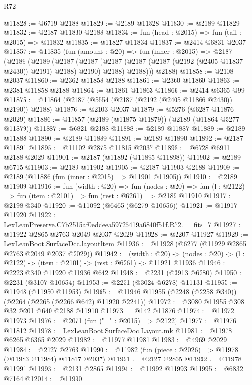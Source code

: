 \begin{lexlean}{R72}
\begin{coremodule}
@11828 := @6719 @2188
@11829 := @2189 @11828
@11830 := @2189 @11829
@11832 := @2187 @11830 @2188
@11834 := fun (head : @2015) => fun (tail : @2015) => @11832
@11835 := @11827 @11834
@11837 := @2414 @6831 @2037
@11857 := @11835
    (fun (amount : @20) =>
    fun (inner : @2015) =>
    @2187
      (@2189
        (@2189
          (@2187
            (@2187 (@2187 (@2187 (@2187 (@2192 (@2405 @11837 @2430)) @2191) @2188) @2190) @2188)
            @2188)))
      @2188)
@11858 := @2108 @2037
@11860 := @2362 @11858 @2188
@11861 := @2360 @11860
@11863 := @2381 @11858 @2188
@11864 := @11861 @11863
@11866 := @2414 @6365 @99
@11875 := @11864 (@2187 (@5554 (@2187 (@2192 (@2405 @11866 @2430)) @2190)) @2188)
@11876 := @2103 @2037
@11879 := @5276 (@6287 @11876 @2029)
@11886 := @11857 (@2189 (@11875 @11879)) (@2189 (@11864 @5277 @11879))
@11887 := @6821 @2188
@11888 := @2189 @11887
@11889 := @2189 @11888
@11890 := @2189 @11889
@11891 := @2189 @11890
@11892 := @2187 @11891
@11895 := @11102 @2875 @11815 @2037
@11898 := @6728 @6911 @2188 @2029
@11901 := @2187 (@11892 (@11895 @11898))
@11902 := @2189 @6715
@11903 := @2189 @11902
@11905 := @2187 @11903 @2188
@11909 := @2189 (@11886 (fun (inner : @2015) => @11901 @11905))
@11910 := @2189 @11909
@11916 := fun (width : @20) =>
  fun (nodes : @20) => fun (l : @2122) => fun (item : @2101) => fun (rest : @6261) => @2189 @11910
@11917 := @2198 @340
@11920 := @11092 (@6465 (@6279 @10656))
@11921 := @11917 @11920
@11922 := LexLeanPreserve.C7b2515af0eddeea59726419a6840f51f.R72.__fits_7
@11927 := @11922 @2865 @2763 @2049 @2037 @2029
@11928 := @2207 @11927
@11929 := LexLeanBoot.SurfaceDoc.layoutItem
@11936 := @11928 (@6277 (@11929 @2865 @2763 @2049 @2037 @2029))
@11942 := (width : @20) ->
  (nodes : @20) -> (l : @2122) -> (item : @2101) -> (rest : @6261) -> @11921 @11936
@11946 := @2223 @340 @11920 @11936 @642
@11948 := @2231 (@3913 @6280)
@11950 := @2231 (@3107 @10654)
@11953 := @2231 (@3024 @6278) @11131
@11955 := @11948 (@11950 @11953)
@11965 := @11946 @11955 (@2248 (@2258 @340)) (@2264 (@2265 (@2266 @642) @11920 @2241))
@11972 := @3080 @11955 @308 @32 @201 @640 @2188 @11910
@11973 := @142 @11876
@11974 := @11972 @11973
@11976 := @2071 (fun ("_" : @2015) => @2122)
@11977 := @11976 @11812
@11978 := LexLeanBoot.SurfaceDoc.Layout.mk
@11981 := @11978 @6265 @6365 @2029
@11982 := @11977 @11981
@11983 := @4969 @2029
@11984 := @2127 @2763
@11990 := @11982 (fun (piece : @2026) => @11978 (@11983 @11984) @11817 @2037)
@11991 := @2127 @2865
@11992 := @11978 @11991
@11993 := @2131 @2865
@11994 := @11992 @11993
@11995 := @6832 @7164
@12014 := @11990

\end{coremodule}
\end{lexlean}
